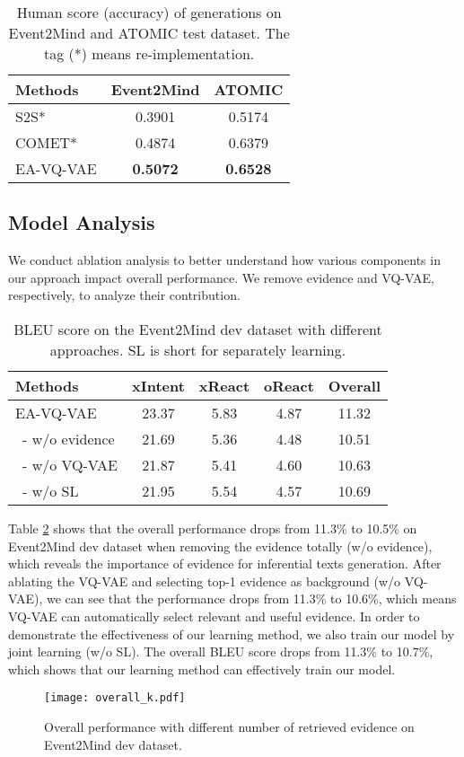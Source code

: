 \documentclass[11pt,a4paper]{article}
\begin{document}
 \begin{table}[h]\small
	\centering
	\begin{tabular}{l|c|c}
		\hline
		Methods & Event2Mind &  ATOMIC \\
		\hline
S2S* & 0.3901 &  0.5174  \\
		COMET* & 0.4874 &  0.6379  \\
		EA-VQ-VAE & \bf{0.5072} &  \bf{0.6528}   \\ 
		\hline
	\end{tabular}
	\caption{Human score (accuracy) of generations on Event2Mind and ATOMIC test dataset. The tag (*) means re-implementation.}
	\label{human} 
	\vspace{-0.2cm}
\end{table}




\subsection{Model Analysis}
We conduct ablation analysis to better understand how various components in our approach impact overall performance. We remove evidence and VQ-VAE, respectively, to analyze their contribution. 
\begin{table}[h]
	\begin{center}
		{\small
			\begin{tabular}{l|cccc} \hline 
Methods& xIntent & xReact & oReact &Overall\\
				\hline
				EA-VQ-VAE & 23.37 &  5.83  & 4.87&11.32\\
				\ - w/o evidence & 21.69 &  5.36  & 4.48&10.51 \\
				\ - w/o VQ-VAE & 21.87 &  5.41  & 4.60&10.63 \\
				\ - w/o SL & 21.95 & 5.54  & 4.57&10.69 \\
				\hline
			\end{tabular}
		}
	\end{center}
	\caption{\label{table:analysis} BLEU score on the Event2Mind dev dataset with different approaches. SL is short for separately learning.}
\end{table}

Table \ref{table:analysis} shows that the overall performance drops from 11.3\% to 10.5\% on Event2Mind dev dataset when removing the evidence totally (w/o evidence), which reveals the importance of evidence for inferential texts generation. 
After ablating the VQ-VAE and selecting top-1 evidence as background (w/o VQ-VAE), we can see that the performance \mbox{drops} from 11.3\% to 10.6\%, which means VQ-VAE can automatically select relevant and useful evidence. 
In order to demonstrate the effectiveness of our learning method, we also train our model by joint learning (w/o SL). The overall BLEU score drops from 11.3\% to 10.7\%, which shows that our learning method can effectively train our model. 
\begin{figure}[h]
	\centering
	\texttt{[image: overall\_k.pdf]}
	\caption{Overall performance with different number of retrieved evidence on Event2Mind dev dataset.}
	\label{fig:k}
\end{figure} 
\end{document}
